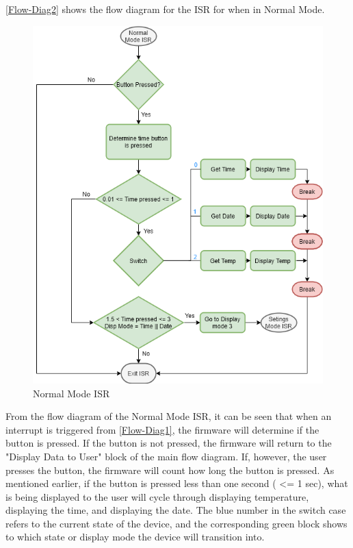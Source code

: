 \\
\\
\autoref{Flow-Diag2} shows the flow diagram for the ISR for when in Normal Mode.
\begin{figure}[H]
	\centering
	\includegraphics[scale=0.5]{img/Flow-Diag2.png}
	\caption{Normal Mode ISR}
	\label{Flow-Diag2}
\end{figure}
\noindent
From the flow diagram of the Normal Mode ISR, it can be seen that when an interrupt is triggered from \autoref{Flow-Diag1}, the firmware will determine if the button is pressed. If the button is not pressed, the firmware will return to the "Display Data to User" block of the main flow diagram. If, however, the user presses the button, the firmware will count how long the button is pressed. As mentioned earlier, if the button is pressed less than one second ( <= 1 sec), what is being displayed to the user will cycle through displaying temperature, displaying the time, and displaying the date. The blue number in the switch case refers to the current state of the device, and the corresponding green block shows to which state or display mode the device will transition into. 
